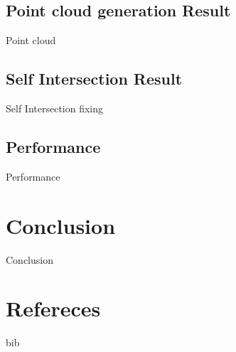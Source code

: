 \documentclass[10pt]{beamer}
\begin{document}
\subsection{Point cloud generation Result}
\begin{frame}{Point cloud}
    
\end{frame}

\subsection{Self Intersection Result}
\begin{frame}{Self Intersection fixing}
    
\end{frame}

\subsection{Performance}
\begin{frame}{Performance}
    
\end{frame}

\section{Conclusion}
\begin{frame}{Conclusion}
    
\end{frame}

\section{Refereces}
\begin{frame}{bib}
    
\end{frame}
\end{document}
